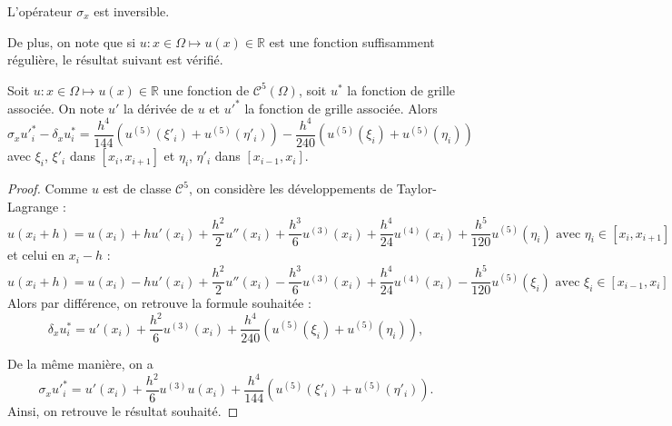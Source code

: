 \begin{corollaire}
L'opérateur $\sigma_x$ est inversible.
\end{corollaire}
De plus, on note que si $u : x \in \Omega \mapsto u(x) \in \mathbb{R}$ est une fonction suffisamment régulière, le résultat suivant est vérifié.

\begin{proposition}
Soit $u : x \in \Omega \mapsto u(x) \in \mathbb{R}$ une fonction de $\mathcal{C}^5 ( \Omega )$, soit $u^*$ la fonction de grille associée. On note $u'$ la dérivée de $u$ et $u'^*$ la fonction de grille associée. Alors 
\begin{equation}
\sigma_x u'^*_i - \delta_x u^*_i = \dfrac{h^4}{144} \left( u^{(5)}(\xi'_i) + u^{(5)}(\eta'_i) \right) - \dfrac{h^4}{240} \left( u^{(5)}(\xi_i) + u^{(5)}(\eta_i) \right)
\end{equation}
avec $\xi_i$, $\xi'_i$ dans $[x_i, x_{i+1}]$ et $\eta_i$, $\eta'_i$ dans $[x_{i-1}, x_{i}]$.
\label{prop:consistence_herm}
\end{proposition}

\begin{proof}
Comme $u$ est de classe $\mathcal{C}^5$, on considère les développements de Taylor-Lagrange :
\begin{equation}
u(x_i+h) = u(x_i) + h u'(x_i) + \dfrac{h^2}{2} u''(x_i) + \dfrac{h^3}{6}u^{(3)}(x_i) + \dfrac{h^4}{24}u^{(4)}(x_i) + \dfrac{h^5}{120}u^{(5)}(\eta_i) \text{ avec } \eta_i \in [x_i, x_{i+1}]
\end{equation}
et celui en $x_i-h$ :
\begin{equation}
u(x_i+h) = u(x_i) - h u'(x_i) + \dfrac{h^2}{2} u''(x_i) - \dfrac{h^3}{6}u^{(3)}(x_i) + \dfrac{h^4}{24}u^{(4)}(x_i) - \dfrac{h^5}{120}u^{(5)}(\xi_i) \text{ avec } \xi_i \in [x_{i-1}, x_{i}]
\end{equation}
Alors par différence, on retrouve la formule souhaitée : 
\begin{equation}
\delta_x u^*_i = u'(x_i) + \dfrac{h^2}{6} u^{(3)}(x_i) +  \dfrac{h^4}{240} \left( u^{(5)}(\xi_i) + u^{(5)}(\eta_i) \right),
\end{equation}

De la même manière, on a 
\begin{equation}
\sigma_x u'^*_i = u'(x_i) +  \dfrac{h^2}{6} u^{(3)}u(x_i) + \dfrac{h^4}{144} \left( u^{(5)}(\xi'_i) + u^{(5)}(\eta'_i) \right).
\end{equation}
Ainsi, on retrouve le résultat souhaité.
\end{proof}

